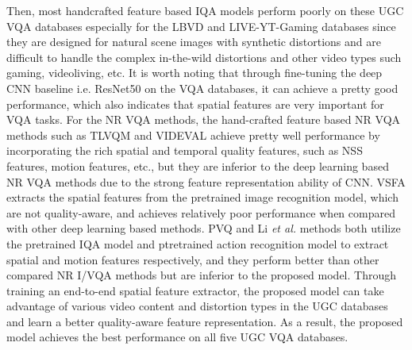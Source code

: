\documentclass[sigconf]{acmart}
\begin{document}
Then, most handcrafted feature based IQA models perform poorly on these UGC VQA databases especially for the LBVD and LIVE-YT-Gaming databases since they are designed for natural scene images with synthetic distortions and are difficult to handle the complex in-the-wild distortions and other video types such gaming, videoliving, etc. It is worth noting that through fine-tuning the deep CNN baseline i.e. ResNet50 on the VQA databases, it can achieve a pretty good performance, which also indicates that spatial features are very important for VQA tasks. For the NR VQA methods, the hand-crafted feature based NR VQA methods such as TLVQM and VIDEVAL achieve pretty well performance by incorporating the rich spatial and temporal quality features, such as NSS features, motion features, etc., but they are inferior to the deep learning based NR VQA methods due to the strong feature representation ability of CNN. VSFA extracts the spatial features from the pretrained image recognition model, which are not quality-aware, and achieves relatively poor performance when compared with other deep learning based methods. PVQ and Li \textit{et al.} methods both utilize the pretrained IQA model and ptretrained action recognition model to extract spatial and motion features respectively, and they perform better than other compared NR I/VQA methods but are inferior to the proposed model. 
Through training an end-to-end spatial feature extractor, the proposed model can take advantage of various video content and distortion types in the UGC databases and learn a better quality-aware feature representation. As a result, the proposed model achieves the best performance on all five UGC VQA databases.
\end{document}
